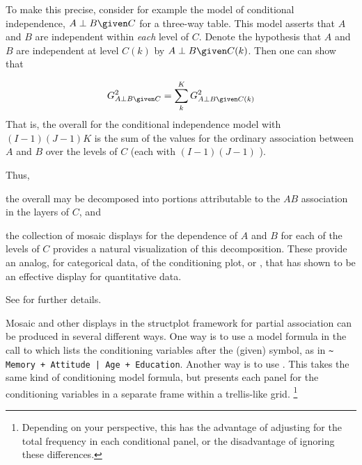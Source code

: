 \documentclass[11pt]{book}\usepackage[]{graphicx}\usepackage[]{color}
\begin{document}
To make this precise, consider for example the model of conditional independence, $A\perp B\given C$
for a three-way table. This model asserts that $A$ and $B$ are independent
within \textit{each} level of $C$. Denote the hypothesis that $A$ and $B$
are independent at level $C(k)$ by $A\perp B\given C(k)$. Then one can show
\citep{Andersen:91} that

\begin{equation}\label{eq:partial1}
G_{A\perp B\given C}^2=\sum_k^K G_{A\perp B\given C(k)}^2
\end{equation}
That is, the overall \GSQ{} for the conditional independence model
with $(I-1)(J-1)K$ \df{} is the
sum of the values for the ordinary association between $A$ and $B$ over the levels of 
$C$ (each with $(I-1)(J-1)$ \df{}).

Thus, 
\begin{seriate}
\item the overall \GSQ may be decomposed into portions attributable
to the $AB$ association in the layers of $C$, and
\item the collection of mosaic displays for the dependence of $A$ and $B$
for each of the levels of $C$ provides a natural visualization of this
decomposition.  These provide an analog, for categorical data, of the conditioning plot, or
, that
\citet{Cleveland:VisData} has shown to be an effective display for
quantitative data.
\end{seriate}
See \citet{Friendly:99b} for further details.

Mosaic and other displays in the structplot framework
for partial association can be produced in several different ways.
One way is to use a model formula in the call to 
which lists the conditioning variables after the  
(given) symbol,
as in \verb/~ Memory + Attitude | Age + Education/.
Another way is to use . This takes the same
kind of conditioning model formula, but presents each panel for
the conditioning variables in a separate frame within a 
 trellis-like grid.%
 \footnote{
 Depending on your perspective, this has the advantage of adjusting
 for the total frequency in each conditional panel, or 
 the disadvantage of ignoring these differences.
 }
 
\end{document}
